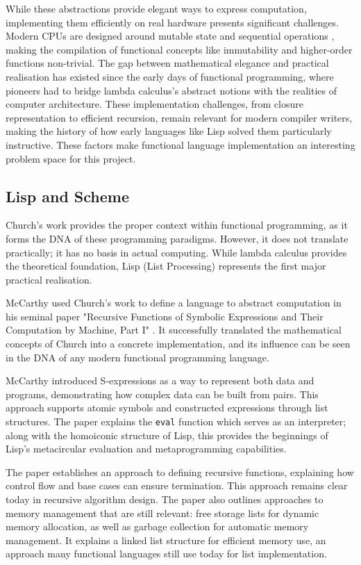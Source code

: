 \documentclass[final]{cmpreport_02}
\begin{document}
While these abstractions provide elegant ways to express computation, implementing them efficiently on real hardware presents significant challenges. Modern CPUs are designed around mutable state and sequential operations \cite{patterson2016computer}, making the compilation of functional concepts like immutability and higher-order functions non-trivial. The gap between mathematical elegance and practical realisation has existed since the early days of functional programming, where pioneers had to bridge lambda calculus's abstract notions with the realities of computer architecture. These implementation challenges, from closure representation to efficient recursion, remain relevant for modern compiler writers, making the history of how early languages like Lisp solved them particularly instructive. These factors make functional language implementation an interesting problem space for this project.
\subsection{Lisp and Scheme}
Church's work provides the proper context within functional programming, as it forms the DNA of these programming paradigms. However, it does not translate practically; it has no basis in actual computing. While lambda calculus provides the theoretical foundation, Lisp (List Processing) represents the first major practical realisation.\newline

McCarthy used Church's work to define a language to abstract computation in his seminal paper "Recursive Functions of Symbolic Expressions and Their Computation by Machine, Part I" \cite{mccarthy1960recursive}. It successfully translated the mathematical concepts of Church into a concrete implementation, and its influence can be seen in the DNA of any modern functional programming language.\newline

McCarthy introduced S-expressions as a way to represent both data and programs, demonstrating how complex data can be built from pairs. This approach supports atomic symbols and constructed expressions through list structures. The paper explains the \texttt{eval} function which serves as an interpreter; along with the homoiconic structure of Lisp, this provides the beginnings of Lisp's metacircular evaluation and metaprogramming capabilities.\newline

The paper establishes an approach to defining recursive functions, explaining how control flow and base cases can ensure termination. This approach remains clear today in recursive algorithm design. The paper also outlines approaches to memory management that are still relevant: free storage lists for dynamic memory allocation, as well as garbage collection for automatic memory management. It explains a linked list structure for efficient memory use, an approach many functional languages still use today for list implementation.\newline
\end{document}
